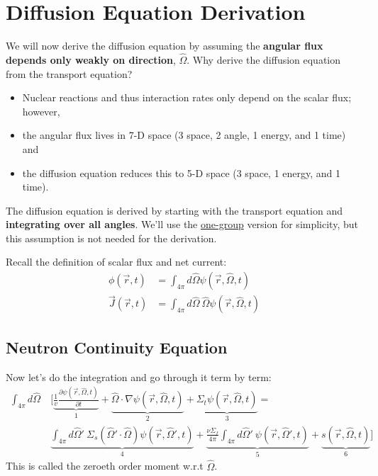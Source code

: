 \documentclass[12pt]{article}
\newlength{\up}
\newcommand{\vOmega}{\ensuremath{\hat{\Omega}}}
\begin{document}
\section*{Diffusion Equation Derivation}

We will now derive the diffusion equation by assuming the \textbf{angular flux depends only weakly on direction}, $\vOmega$. 
%
Why derive the diffusion equation from the transport equation?
\begin{itemize}
\item Nuclear reactions and thus interaction rates only depend on the scalar flux; however,
\item the angular flux lives in 7-D space (3 space, 2 angle, 1 energy, and 1 time) and
\item the diffusion equation reduces this to 5-D space (3 space, 1 energy, and 1 time).
\end{itemize}

The diffusion equation is derived by starting with the transport equation and \textbf{integrating over all angles}. We'll use the \underline{one-group} version for simplicity, but this assumption is not needed for the derivation. 

Recall the definition of scalar flux and net current:
\begin{align*}
\phi(\vec{r}, t) &= \int_{4\pi} d\vOmega \psi(\vec{r}, \vOmega, t) \\
\vec{J}(\vec{r}, t) &= \int_{4\pi} d\vOmega \:\vOmega \psi(\vec{r}, \vOmega, t)
\end{align*}

\subsection*{Neutron Continuity Equation}
Now let's do the integration and go through it term by term:
%
\begin{align*}
\int_{4\pi} d\vOmega\: &\biggl[\underbrace{\frac{1}{v}\frac{\partial \psi(\vec{r}, \vOmega, t)}{\partial t}}_{1} + 
\underbrace{\vOmega \cdot \nabla \psi(\vec{r}, \vOmega, t)}_{2} +
\underbrace{\Sigma_t \psi(\vec{r}, \vOmega, t)}_{3} = \nonumber\\
%
&\underbrace{\int_{4\pi} d\vOmega'\: \Sigma_s(\vOmega' \cdot \vOmega) \psi(\vec{r}, \vOmega', t)}_{4} 
+ \underbrace{\frac{\nu \Sigma_f}{4\pi} \int_{4\pi} d\vOmega'\: \psi(\vec{r},  \vOmega', t)}_{5}
+ \underbrace{s(\vec{r}, \vOmega, t)}_{6}\biggr]
\end{align*}
%
This is called the zeroeth order moment w.r.t $\vOmega$. 
\end{document}
